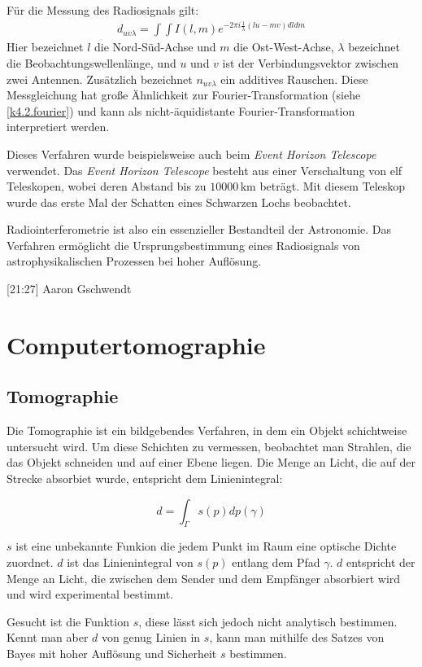 \documentclass[]{dsadokumentation}
\begin{document}
Für die Messung des Radiosignals gilt:
\begin{eqnarray}
d_{uv\lambda} =\int\int I(l,m)e^{-2\pi i \frac{1}{\lambda}(lu-mv)dldm}
\end{eqnarray}
Hier bezeichnet $l$ die Nord-Süd-Achse und $m$ die Ost-West-Achse, $\lambda$ bezeichnet die Beobachtungswellenlänge, und $u$ und $v$ ist der Verbindungsvektor zwischen zwei Antennen. Zusätzlich bezeichnet $n_{uv\lambda}$ ein additives Rauschen. Diese Messgleichung hat große Ähnlichkeit zur Fourier-Transformation (siehe \cref{k4.2.fourier}) und kann als nicht-äquidistante Fourier-Transformation interpretiert werden.

Dieses Verfahren wurde beispielsweise auch beim \emph{Event Horizon Telescope} verwendet. Das \emph{Event Horizon Telescope} besteht aus einer Verschaltung von elf Teleskopen, wobei deren Abstand bis zu $10000\,\text{km}$ beträgt. Mit diesem Teleskop wurde das erste Mal der Schatten eines Schwarzen Lochs beobachtet.

Radiointerferometrie ist also ein essenzieller Bestandteil der Astronomie. Das Verfahren ermöglicht die Ursprungsbestimmung eines Radiosignals von astrophysikalischen Prozessen bei hoher Auflösung.




[21:27] Aaron Gschwendt
\section{Computertomographie}\label{k4.2.comptomo.ct}
\subsection{Tomographie}

Die Tomographie ist ein bildgebendes Verfahren, in dem ein Objekt schichtweise untersucht wird. Um diese Schichten zu vermessen, beobachtet man Strahlen, die das Objekt schneiden und auf einer Ebene liegen. Die Menge an Licht, die auf der Strecke absorbiet wurde, entspricht dem Linienintegral:

$$d=\int_{\Gamma}{}s(p)dp(\gamma)$$

$s$ ist eine unbekannte Funkion die jedem Punkt im Raum eine optische Dichte zuordnet. $d$ ist das Linienintegral von $s(p)$ entlang dem Pfad $\gamma$. $d$ entspricht der Menge an Licht, die zwischen dem Sender und dem Empfänger absorbiert wird und wird experimental bestimmt.

Gesucht ist die Funktion $s$, diese lässt sich jedoch nicht analytisch bestimmen. Kennt man aber $d$ von genug Linien in $s$, kann man mithilfe des Satzes von Bayes mit hoher Auflösung und Sicherheit $s$ bestimmen.
\end{document}
